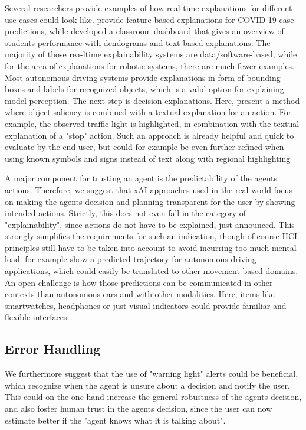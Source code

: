 \documentclass[twoside,11pt]{article}
\begin{document}
Several researchers provide examples of how real-time explanations for different use-cases could look like. \cite{RodriguezEtAl:2021:DeepCovidxAI} provide feature-based explanations for COVID-19 case predictions, while \cite{Kulkarni:2021:EducationAIDashboard} developed a classroom dashboard that gives an overview of students performance with dendograms and text-based explanations. The majority of those rea-ltime explainability systems are data/software-based, while for the area of explanations for robotic systems, there are much fewer examples.
Most autonomous driving-systems provide explanations in form of bounding-boxes and labels for recognized objects, which is a valid option for explaining model perception. 
The next step is decision explanations. Here, \cite{Ben-YounesEtAl:2022:DrivingBehaviorEx} present a method where object saliency is combined with a textual explanation for an action. For example, the observed traffic light is highlighted, in combination with the textual explanation of a "stop" action. Such an approach is already helpful and quick to evaluate by the end user, but could for example be even further refined when using known symbols and signs instead of text along with regional highlighting 

A major component for trusting an agent is the predictability of the agents actions. Therefore, we suggest that xAI approaches used in the real world focus on making the agents decision and planning transparent for the user by showing intended actions. Strictly, this does not even fall in the category of "explainability", since actions do not have to be explained, just announced. This strongly simplifies the requirements for such an indication, though of course HCI principles still have to be taken into account to avoid incurring too much mental load. \cite{Caltagarione:2017:DrivingPathGeneration} for example show a predicted trajectory for autonomous driving applications, which could easily be translated to other movement-based domains. 
An open challenge is how those predictions can be communicated in other contexts than autonomous cars and with other modalities. Here, items like smartwatches, headphones or just visual indicators could provide familiar and flexible interfaces.

\subsection{Error Handling}
We furthermore suggest that the use of "warning light" alerts could be beneficial, which recognize when the agent is unsure about a decision and notify the user. This could on the one hand increase the general robustness of the agents decision, and also foster human trust in the agents decision, since the user can now estimate better if the "agent knows what it is talking about".
\end{document}
